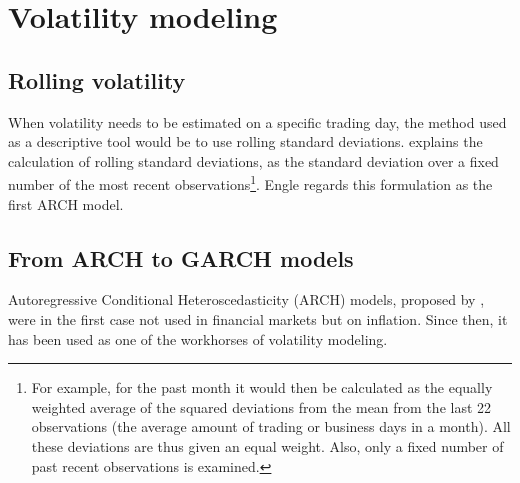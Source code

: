 \documentclass[a4paper, nobind]{templates/ociamthesis}
\begin{document}
\newpage

\hypertarget{vol-mod}{%
\section{Volatility modeling}\label{vol-mod}}

\hypertarget{rolling-volatility}{%
\subsection{Rolling volatility}\label{rolling-volatility}}

\noindent When volatility needs to be estimated on a specific trading day, the method used as a descriptive tool would be to use rolling standard deviations. \textcite{engle2001} explains the calculation of rolling standard deviations, as the standard deviation over a fixed number of the most recent observations\footnote{For example, for the past month it would then be calculated as the equally weighted average of the squared deviations from the mean from the last 22 observations (the average amount of trading or business days in a month). All these deviations are thus given an equal weight. Also, only a fixed number of past recent observations is examined.}. Engle regards this formulation as the first ARCH model.

\hypertarget{univ-garch}{%
\subsection{From ARCH to GARCH models}\label{univ-garch}}

\noindent Autoregressive Conditional Heteroscedasticity (ARCH) models, proposed by \textcite{engle1982}, were in the first case not used in financial markets but on inflation. Since then, it has been used as one of the workhorses of volatility modeling.~\\
\end{document}
